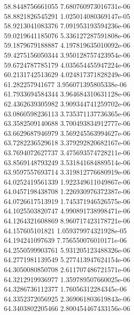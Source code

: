 {58.8448756661055 7.680760973016731e-06 \\
58.8821826545291 1.025014080369147e-05 \\
58.9213041083376 7.091953193594236e-06 \\
59.0219641185076 5.336127287591808e-06 \\
59.1879679188887 4.197819635010092e-06 \\
59.4275156050344 3.950128757423954e-06 \\
59.6724787785179 4.035654455947224e-06 \\
60.2131742513629 4.024817371828249e-06 \\
61.282257941677 3.956071395805338e-06 \\
61.7933694584344 3.964684310631128e-06 \\
62.4362639305982 3.909344741259702e-06 \\
63.0860598236113 3.735371137736365e-06 \\
63.3582509140688 3.700493834912777e-06 \\
63.6629687946979 3.569245563994627e-06 \\
63.7282236529618 3.379292820682167e-06 \\
63.7694072627737 3.475693574728211e-06 \\
63.8569148793249 3.531841684889514e-06 \\
63.9597557693714 3.319812776680919e-06 \\
64.0252419561339 1.922349611049867e-06 \\
64.0457198438708 1.226930976372387e-06 \\
64.0726617513919 1.745371946526575e-06 \\
64.1025503820747 4.990891738998471e-06 \\
64.1264321608869 8.960717423178721e-06 \\
64.157605101821 1.059379974321928e-05 \\
64.194241097639 7.756550076010171e-06 \\
64.2550599903761 5.931205123488326e-06 \\
64.2771981139549 5.277413947624154e-06 \\
64.3050080850708 2.611707486721571e-06 \\
64.3212919936977 1.359789507660025e-06 \\
64.3286736112377 1.76056312284345e-06 \\
64.3352372056925 2.369061803619843e-06 \\
64.3403802205466 2.800454467433156e-06 \\
}
